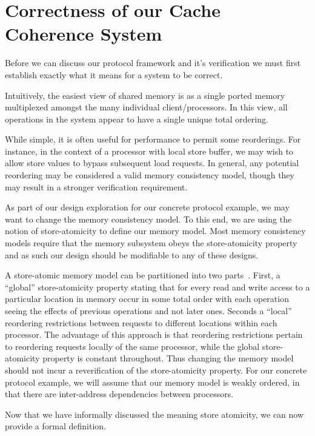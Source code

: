 \section{Correctness of our Cache Coherence System}

Before we can discuss our protocol framework and it's verification we
must first establish exactly what it means for a system to be
correct. 

Intuitively, the easiest view of shared memory is as a single ported
memory multiplexed amongst the many individual client/processors. In
this view, all operations in the system appear to have a single unique
total ordering. 

While simple, it is often useful for performance to permit some
reorderings. For instance, in the context of a processor with local
store buffer, we may wish to allow store values to bypass subsequent
load requests. In general, any potential reordering may be considered
a valid memory consistency model, though they may result in a stronger
verification requirement.

As part of our design exploration for our concrete protocol example,
we may want to change the memory consistency model. To this end, we
are using the notion of store-atomicity to define our memory
model. Most memory consistency models require that the memory
subsystem obeys the store-atomicity property and as such our design
should be modifiable to any of these designs. 

A store-atomic memory model can be partitioned into two
parts~\cite{Arvind-memory-model}. First, a ``global'' store-atomicity
property stating that for every read and write access to a particular
location in memory occur in some total order with each operation
seeing the effects of previous operations and not later ones. Seconds
a ``local'' reordering restrictions between requests to different
locations within each processor. The advantage of this approach is
that reordering restrictions pertain to reordering requests locally of
the same processor, while the global store-atomicity property is
constant throughout. Thus changing the memory model should not incur a
reverification of the store-atomicity property. For our concrete
protocol example, we will assume that our memory model is weakly
ordered, in that there are inter-address dependencies between
processors.

Now that we have informally discussed the meaning store atomicity, we
can now provide a formal definition.



